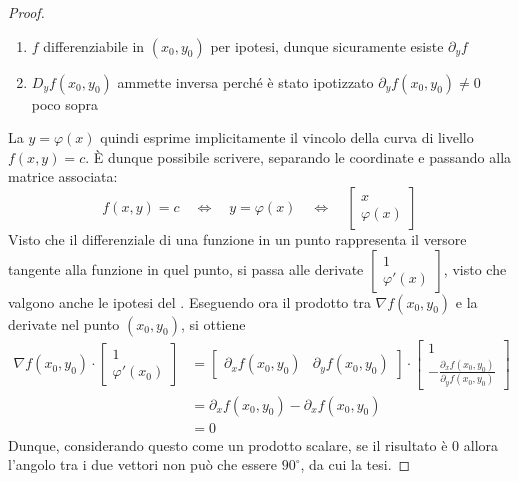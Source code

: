 \begin{proposition}
\begin{proof}
\begin{note}
\begin{enumerate}
				\item $f$ differenziabile in $(x_0, y_0)$ per ipotesi, dunque sicuramente esiste $\partial_y f$
				\item $D_yf(x_0, y_0)$ ammette inversa perché è stato ipotizzato $\partial_y f(x_0,y_0) \neq 0$ poco sopra
			\end{enumerate}
		\end{note}
		La $y = \varphi(x)$ quindi esprime implicitamente il vincolo della curva di livello $f(x, y) = c$. È dunque possibile scrivere, separando le coordinate e passando alla matrice associata:
		\[
			f(x, y) = c \quad \iff \quad y = \varphi(x) \quad \iff \quad
			\begin{bmatrix}
				x\\
				\varphi(x)
			\end{bmatrix}
		\]
		Visto che il differenziale di una funzione in un punto rappresenta il versore tangente alla funzione in quel punto, si passa alle derivate $\begin{bmatrix}1\\\varphi'(x)\end{bmatrix}$, visto che valgono anche le ipotesi del . Eseguendo ora il prodotto tra $\nabla f(x_0, y_0)$ e la derivate nel punto $(x_0, y_0)$, si ottiene
		\begin{align*}
			\nabla f(x_0, y_0) \cdot \begin{bmatrix}1\\\varphi'(x_0)\end{bmatrix}
			&= \begin{bmatrix}
				\partial_x f(x_0, y_0) & \partial_y f(x_0, y_0)
			\end{bmatrix}
			\cdot
			\begin{bmatrix}
				1\\
				-\frac{\partial_x f(x_0, y_0)}{\partial_y f(x_0, y_0)}
			\end{bmatrix}\\
			&= \partial_x f(x_0, y_0) - \partial_x f(x_0, y_0)\\
			&= 0
		\end{align*}
		Dunque, considerando questo come un prodotto scalare, se il risultato è $0$ allora l'angolo tra i due vettori non può che essere $90^\circ$, da cui la tesi.
	\end{proof}
\end{proposition}

